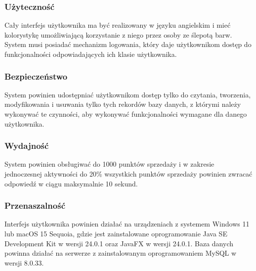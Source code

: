 \documentclass[a4paper,12pt]{article}
\begin{document}
\subsubsection{Użyteczność}

Cały interfejs użytkownika ma być realizowany w języku angielskim i mieć kolorystykę umożliwiającą korzystanie z niego przez osoby ze ślepotą barw.
System musi posiadać mechanizm logowania, który daje użytkownikom dostęp do funkcjonalności odpowiadających ich klasie użytkownika.

\subsubsection{Bezpieczeństwo}

System powinien udostępniać użytkownikom dostęp tylko do czytania, tworzenia, modyfikowania i usuwania tylko tych rekordów bazy danych, z którymi należy wykonywać te czynności, aby wykonywać funkcjonalności wymagane dla danego użytkownika.

\subsubsection{Wydajność}

System powinien obsługiwać do 1000 punktów sprzedaży i w zakresie jednoczesnej aktywności do 20\% wszystkich punktów sprzedaży powinien zwracać odpowiedź w ciągu maksymalnie 10 sekund.

\subsubsection{Przenaszalność}

Interfejs użytkownika powinien działać na urządzeniach z systemem Windows 11 lub macOS 15 Sequoia, gdzie jest zainstalowane oprogramowanie Java SE Development Kit w wersji 24.0.1 oraz JavaFX w wersji 24.0.1.
Baza danych powinna działać na serwerze z zainstalowanym oprogramowaniem MySQL w wersji 8.0.33.
\end{document}
